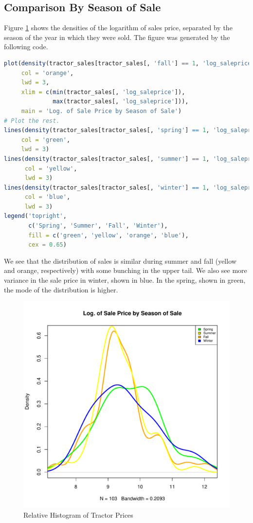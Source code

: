 \pagebreak
\subsection{Comparison By Season of Sale}

Figure \ref{fig:dens_by_season} shows
the densities of the logarithm of sales price,
separated by the season of the year in which they were sold.
The figure was generated by the following code.
%
\vfill

\begin{lstlisting}[language=R]
plot(density(tractor_sales[tractor_sales[, 'fall'] == 1, 'log_saleprice']),
     col = 'orange',
     lwd = 3,
     xlim = c(min(tractor_sales[, 'log_saleprice']),
              max(tractor_sales[, 'log_saleprice'])),
     main = 'Log. of Sale Price by Season of Sale')
# Plot the rest.
lines(density(tractor_sales[tractor_sales[, 'spring'] == 1, 'log_saleprice']),
     col = 'green',
     lwd = 3)
lines(density(tractor_sales[tractor_sales[, 'summer'] == 1, 'log_saleprice']),
      col = 'yellow',
      lwd = 3)
lines(density(tractor_sales[tractor_sales[, 'winter'] == 1, 'log_saleprice']),
      col = 'blue',
      lwd = 3)
legend('topright',
       c('Spring', 'Summer', 'Fall', 'Winter'),
       fill = c('green', 'yellow', 'orange', 'blue'),
       cex = 0.65)
\end{lstlisting}

\pagebreak
We see that the distribution of sales is similar
during summer and fall (yellow and orange, respectively)
with some bunching in the upper tail.
We also see more variance in the sale price in winter,
shown in blue.
In the spring, shown in green, the mode of the distribution
is higher.

\begin{figure}[h!]
  \centering
  \includegraphics[scale = 0.5, keepaspectratio=true]{../Figures/dens_by_season}
  \caption{Relative Histogram of Tractor Prices} \label{fig:dens_by_season}
\end{figure}


